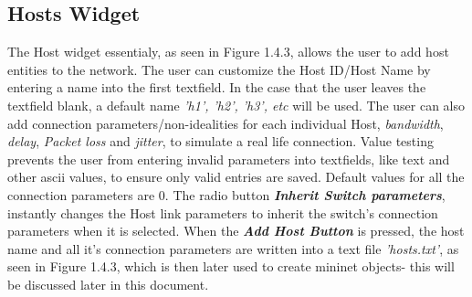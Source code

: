\subsection{Hosts Widget}
The Host widget essentialy, as seen in Figure 1.4.3, allows the user to add host entities to the network. The user can customize the Host ID/Host Name by entering a name into the first textfield. In the case that the user leaves the textfield blank, a default name \textit{'h1', 'h2', 'h3', etc} will be used. The user can also add connection parameters/non-idealities for each individual Host, \textit{bandwidth}, \textit{delay}, \textit{Packet loss} and \textit{jitter}, to simulate a real life connection. Value testing prevents the user from entering invalid parameters into textfields, like text and other ascii values, to ensure only valid entries are saved. Default values for all the connection parameters are 0. The radio button \textbf{\textit{Inherit Switch parameters}}, instantly changes the Host link parameters to inherit the switch's connection parameters when it is selected. When the \textbf{\textit{Add Host Button} }is pressed, the host name and all it's connection parameters are written into a text file \textit{'hosts.txt'}, as seen in Figure 1.4.3, which is then later used to create mininet objects- this will be discussed later in this document.\\
